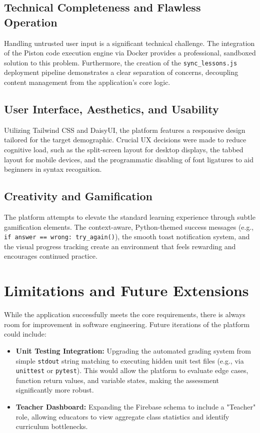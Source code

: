 \documentclass[12pt]{report}
\begin{document}
\subsection{Technical Completeness and Flawless Operation}
Handling untrusted user input is a significant technical challenge. The integration of the Piston code execution engine via Docker provides a professional, sandboxed solution to this problem. Furthermore, the creation of the \texttt{sync\_lessons.js} deployment pipeline demonstrates a clear separation of concerns, decoupling content management from the application's core logic.

\subsection{User Interface, Aesthetics, and Usability}
Utilizing Tailwind CSS and DaisyUI, the platform features a responsive design tailored for the target demographic. Crucial UX decisions were made to reduce cognitive load, such as the split-screen layout for desktop displays, the tabbed layout for mobile devices, and the programmatic disabling of font ligatures to aid beginners in syntax recognition.

\subsection{Creativity and Gamification}
The platform attempts to elevate the standard learning experience through subtle gamification elements. The context-aware, Python-themed success messages (e.g., \texttt{if answer == wrong: try\_again()}), the smooth toast notification system, and the visual progress tracking create an environment that feels rewarding and encourages continued practice.

\section{Limitations and Future Extensions}
While the application successfully meets the core requirements, there is always room for improvement in software engineering. Future iterations of the platform could include:
\begin{itemize}
    \item \textbf{Unit Testing Integration:} Upgrading the automated grading system from simple \texttt{stdout} string matching to executing hidden unit test files (e.g., via \texttt{unittest} or \texttt{pytest}). This would allow the platform to evaluate edge cases, function return values, and variable states, making the assessment significantly more robust.
    \item \textbf{Teacher Dashboard:} Expanding the Firebase schema to include a "Teacher" role, allowing educators to view aggregate class statistics and identify curriculum bottlenecks.
\end{itemize}
\end{document}
